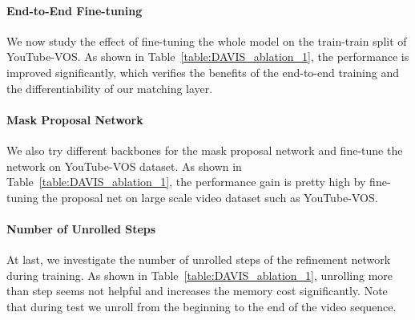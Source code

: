 \paragraph{End-to-End Fine-tuning}
We now study the effect of fine-tuning the whole model on the train-train split of YouTube-VOS.
As shown in Table~\ref{table:DAVIS_ablation_1}, the performance is improved significantly, which verifies the benefits of the end-to-end training and the differentiability of our matching layer.

\paragraph{Mask Proposal Network}
We also try different backbones for the mask proposal network and fine-tune the network on YouTube-VOS dataset. As shown in Table~\ref{table:DAVIS_ablation_1}, the performance gain is pretty high by fine-tuning the proposal net on large scale video dataset such as YouTube-VOS.


\paragraph{Number of Unrolled Steps} 
At last, we investigate the number of unrolled steps of the refinement network during training.
As shown in Table~\ref{table:DAVIS_ablation_1}, unrolling more than  step seems not helpful and increases the memory cost significantly.
Note that during test we unroll from the beginning to the end of the video sequence. 















